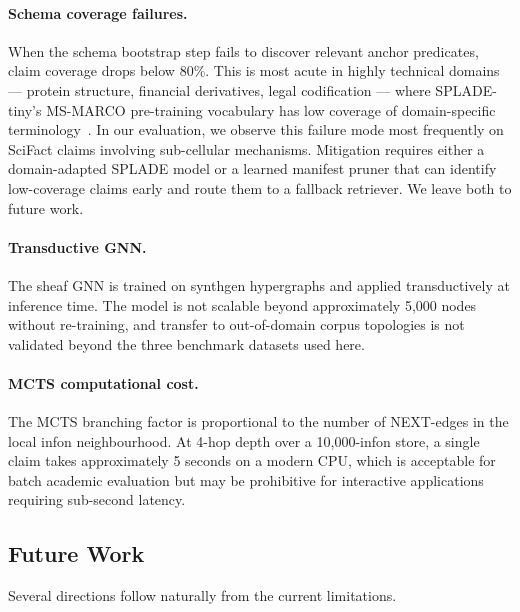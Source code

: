 \paragraph{Schema coverage failures.}
When the schema bootstrap step fails to discover relevant anchor predicates,
claim coverage drops below 80\%.  This is most acute in highly technical
domains — protein structure, financial derivatives, legal codification —
where SPLADE-tiny's MS-MARCO pre-training vocabulary has low coverage of
domain-specific terminology~\cite{formal2021splade}.  In our evaluation, we
observe this failure mode most frequently on SciFact claims involving
sub-cellular mechanisms.  Mitigation requires either a domain-adapted
SPLADE model or a learned manifest pruner that can identify low-coverage
claims early and route them to a fallback retriever.  We leave both to
future work.

\paragraph{Transductive GNN.}
The sheaf GNN is trained on synthgen hypergraphs and applied transductively
at inference time.  The model is not scalable beyond approximately 5,000
nodes without re-training, and transfer to out-of-domain corpus topologies
is not validated beyond the three benchmark datasets used here.

\paragraph{MCTS computational cost.}
The MCTS branching factor is proportional to the number of NEXT-edges in
the local infon neighbourhood.  At 4-hop depth over a 10,000-infon store,
a single claim takes approximately 5 seconds on a modern CPU, which is
acceptable for batch academic evaluation but may be prohibitive for
interactive applications requiring sub-second latency.

\subsection{Future Work}
\label{sec:discussion:future}

Several directions follow naturally from the current limitations.

